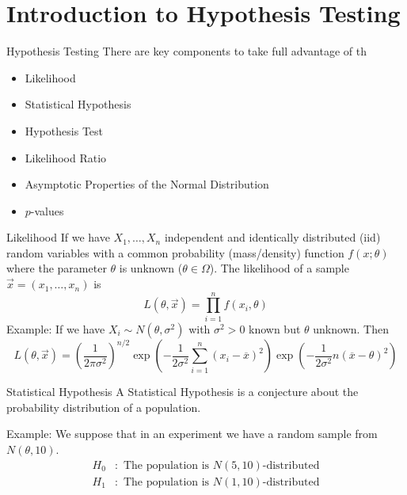 \documentclass{beamer}
\begin{document}
\section{Introduction to Hypothesis Testing}	
\begin{frame}{Hypothesis Testing}
	There are key components to take full advantage of th
	
	\begin{itemize}
		\item Likelihood
		\item Statistical Hypothesis
		\item Hypothesis Test
		\item Likelihood Ratio
		\item Asymptotic Properties of the Normal Distribution
		\item $p$-values
	\end{itemize}
\end{frame}
\begin{frame}{Likelihood}
	If we have $X_1,\ldots, X_n$ independent and identically distributed (iid) random variables with a common probability (mass/density) function $f(x;\theta)$ where the parameter $\theta$ is unknown ($\theta \in \Omega$). The likelihood of a sample $\vec{x}=(x_1,\ldots,x_n)$ is 
	\begin{equation*}
		L(\theta,\vec{x})= \prod_{i=1}^n f(x_i,\theta)
	\end{equation*}
	Example: If we have $X_i \sim N(\theta,\sigma^2)$ with $\sigma^2>0$ known but $\theta$ unknown. Then
	\begin{equation*}
		L(\theta,\vec{x})= \left(\frac{1}{2\pi \sigma^2}\right)^{n/2}
		\exp\left(- \frac{1}{2\sigma^2}\sum_{i=1}^n (x_i-\overline{x})^2\right)\exp\left(- \frac{1}{2\sigma^2}n(\overline{x}-\theta)^2\right)
	\end{equation*}
\end{frame}

\begin{frame}{Statistical Hypothesis}
	A Statistical Hypothesis is a conjecture about the probability distribution of a population. 
	
	Example: We suppose that in an experiment we have a random sample from $N(\theta,10)$. 
	\begin{equation*}
		\begin{split}
			H_0 &\colon \text{ The population is } N(5,10) \text{-distributed}\\
			H_1 &\colon \text{ The population is } N(1,10) \text{-distributed}
		\end{split}
	\end{equation*}
\end{frame}
\end{document}
